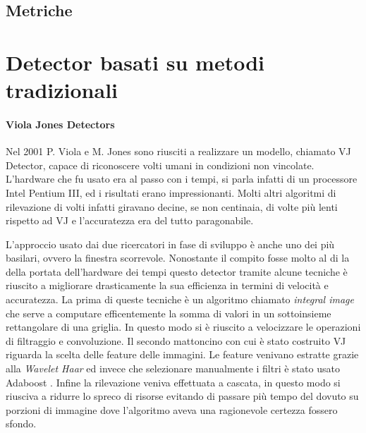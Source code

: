 \subsection{Metriche}
\section{Detector basati su metodi tradizionali}
\label{sec:traditional_method}

\paragraph{Viola Jones Detectors}
Nel 2001 P. Viola e M. Jones \cite{viola2001rapid, viola2004robust} sono riusciti a realizzare un modello, chiamato \ac{VJ} Detector, capace di riconoscere volti umani in condizioni non vincolate. L'hardware che fu usato era al passo con i tempi, si parla infatti di un processore Intel Pentium III, ed i risultati erano impressionanti. Molti altri algoritmi di rilevazione di volti infatti giravano decine, se non centinaia, di volte più lenti rispetto ad \ac{VJ} e l'accuratezza era del tutto paragonabile. 

L'approccio usato dai due ricercatori in fase di sviluppo è anche uno dei più basilari, ovvero la finestra scorrevole. Nonostante il compito fosse molto al di la della portata dell'hardware dei tempi questo detector tramite alcune tecniche è riuscito a migliorare drasticamente la sua efficienza in termini di velocità e accuratezza. 
La prima di queste tecniche è un algoritmo chiamato \textit{integral image} che serve a computare efficentemente la somma di valori in un sottoinsieme rettangolare di una griglia. In questo modo si è riuscito a velocizzare le operazioni di filtraggio e convoluzione. 
Il secondo mattoncino con cui è stato costruito \ac{VJ} riguarda la scelta delle feature delle immagini. Le feature venivano estratte grazie alla \textit{Wavelet Haar} ed invece che selezionare manualmente i filtri è stato usato Adaboost \cite{freund1999short}. 
Infine la rilevazione veniva effettuata a cascata, in questo modo si riusciva a ridurre lo spreco di risorse evitando di passare più tempo del dovuto su porzioni di immagine dove l'algoritmo aveva una ragionevole certezza fossero sfondo. 
